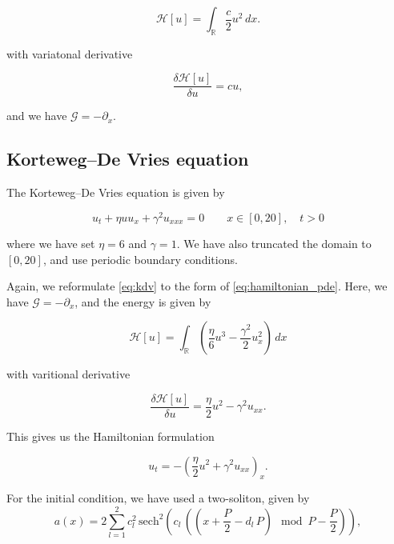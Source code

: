 \begin{equation}
    \mathcal{H}[u] = \int_\mathbb{R} \frac{c}{2} u^2 \, dx.
    \label{eq:advection_energy}
\end{equation}

with variatonal derivative

\begin{equation}
    \frac{\delta \mathcal{H}[u]}{\delta u} = c u,
    \label{eq:advection_variational_derivative}
\end{equation}

and we have \(\mathcal{G} = -\partial_x\).

\subsection{Korteweg–De Vries equation}
The Korteweg–De Vries equation is given by

\begin{equation}
    u_t + \eta u u_x + \gamma^2 u_{xxx} = 0 \qquad x \in [0,20], \quad t > 0
    \label{eq:kdv}
\end{equation}

where we have set \(\eta = 6\) and \(\gamma = 1\). We have also truncated the domain to \([0,20]\), and use periodic boundary conditions.

Again, we reformulate \cref{eq:kdv} to the form of \cref{eq:hamiltonian_pde}. Here, we have \(\mathcal{G}=-\partial_x\), and the energy is given by

\begin{equation}
    \mathcal{H}[u] = \int_\mathbb{R} \left(\frac{\eta}{6} u^3 - \frac{\gamma^2}{2}u_x^2 \right)\, dx
    \label{eq:kdv_energy}
\end{equation}

with varitional derivative

\begin{equation}
    \frac{\delta\mathcal{H}[u]}{\delta u} = \frac{\eta}{2} u^2 - \gamma^2u_{xx}.
    \label{eq:kdv_variational_derivative}
\end{equation}

This gives us the Hamiltonian formulation

\begin{equation}
    u_t = -\left(\frac{\eta}{2} u^2 + \gamma^2 u_{xx}\right)_x.
    \label{eq:kdv_hamiltonian_pde}
\end{equation}

For the initial condition, we have used a two-soliton, given by
\begin{equation}
    \label{eq:kdv_initial_condition}
        a(x) = 2 \sum_{l=1}^2 c_l^2 \, \text{sech}^2\left(c_l \, \left(\left(x+\frac{P}{2}-d_l \, P\right) \mod P - \frac{P}{2}\right)\right),
\end{equation}

